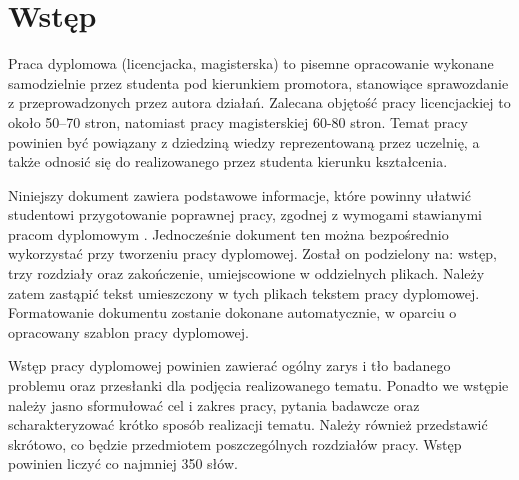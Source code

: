 \chapter*{Wstęp}
\label{chap:wstep}
\addtocounter{chapter}{0}

Praca dyplomowa (licencjacka, magisterska) to pisemne opracowanie wykonane samodzielnie przez studenta pod kierunkiem promotora, stanowiące sprawozdanie z przeprowadzonych przez autora działań. Zalecana objętość pracy licencjackiej to około 50–70 stron, natomiast pracy magisterskiej 60-80 stron. Temat pracy powinien być powiązany z dziedziną wiedzy reprezentowaną przez uczelnię, a także odnosić się do realizowanego przez studenta kierunku kształcenia.

Niniejszy dokument zawiera podstawowe informacje, które powinny ułatwić studentowi przygotowanie poprawnej pracy, zgodnej z wymogami stawianymi pracom dyplomowym \cite{dirac}. Jednocześnie dokument ten można bezpośrednio wykorzystać przy tworzeniu pracy dyplomowej. Został on podzielony na: wstęp, trzy rozdziały oraz zakończenie, umiejscowione w oddzielnych plikach. Należy zatem zastąpić tekst umieszczony w tych plikach tekstem pracy dyplomowej. Formatowanie dokumentu zostanie dokonane automatycznie, w oparciu o opracowany szablon pracy dyplomowej.

Wstęp pracy dyplomowej powinien zawierać ogólny zarys i tło badanego problemu oraz przesłanki dla podjęcia realizowanego tematu. Ponadto we wstępie należy jasno sformułować cel i zakres pracy, pytania badawcze oraz scharakteryzować krótko sposób realizacji tematu. Należy również przedstawić skrótowo, co będzie przedmiotem poszczególnych rozdziałów pracy. Wstęp powinien liczyć co najmniej 350 słów.
